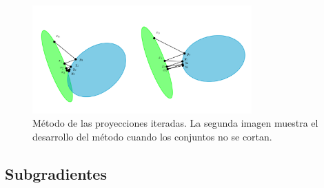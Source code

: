 \begin{figure}[h]
    \centering
    \includegraphics[width=0.75\textwidth]{./images/iterated_projections.png}
    \caption{Método de las proyecciones iteradas. La segunda imagen muestra el desarrollo del método cuando los conjuntos no se cortan.} \label{fig:iterproj}
\end{figure}

\subsection{Subgradientes}